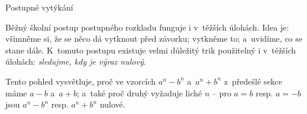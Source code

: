 \secc Postupné vytýkání

Běžný školní postup postupného rozkladu funguje i v~těžších úlohách. Idea je: všimněme si, že se něco dá vytknout před závorku; vytkněme to; a~uvidíme, co se stane dále. K~tomuto postupu existuje velmi důležitý trik použitelný i v~těžších úlohách: \textit{sledujme, kdy je výraz nulový}.


Tento pohled vysvětluje, proč ve vzorcích $a^n-b^n$ a~$a^n+b^n$ z~předešlé sekce máme $a-b$ a~$a+b$; a~také proč druhý vyžaduje liché $n$ -- pro $a=b$ resp. $a=-b$ jsou $a^n-b^n$ resp. $a^n + b^n$ nulové.

